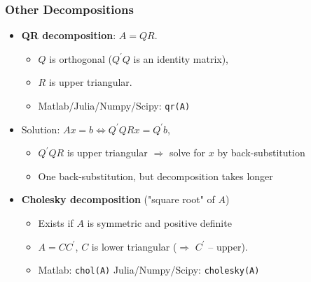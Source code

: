 \documentclass[bigger]{beamer}
\begin{document}
\begin{frame}%


\frametitle{Other Decompositions}

\begin{itemize}
\item \textbf{QR decomposition}: $A=QR$. 

\begin{itemize}
\item $Q$ is orthogonal ($Q^{\prime }Q$ is an identity matrix),

\item $R$ is upper triangular.
\item Matlab/Julia/Numpy/Scipy: \texttt{qr(A)}
\end{itemize}

\item Solution: $Ax=b\Leftrightarrow Q^{\prime }QRx=Q^{\prime }b$,

\begin{itemize}
\item $Q^{\prime }QR$ is upper triangular $\Rightarrow $ solve for $x$ by
back-substitution

\item One back-substitution, but decomposition takes longer\bigskip
\end{itemize}

\item \textbf{Cholesky decomposition} ("square root" of $A$)

\begin{itemize}
\item Exists if $A$ is symmetric and positive definite

\item $A=CC^{\prime }$, $C$ is lower triangular ($\Rightarrow $ $C^{\prime }$
-- upper).

\item Matlab: \texttt{chol(A)} Julia/Numpy/Scipy: \texttt{cholesky(A)}
\end{itemize}
\end{itemize}


\end{frame}%
\end{document}
